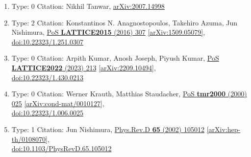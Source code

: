 \documentclass[a4paper,10pt]{article}
\begin{document}
\begin{enumerate}
\begin{enumerate}
  \item Type: 0 Citation: Nikhil Tanwar, \href{https://arxiv.org/abs/2007.14998}{arXiv:2007.14998}
  \item Type: 2 Citation: Konstantinos N. Anagnostopoulos, Takehiro Azuma, Jun Nishimura, \href{https://www.doi.org/10.22323/1.251.0307}{PoS {\bf LATTICE2015} (2016) 307}  \href{https://arxiv.org/abs/1509.05079}{[arXiv:1509.05079]},\\\href{https://www.doi.org/10.22323/1.251.0307}{doi:10.22323/1.251.0307}
  \item Type: 0 Citation: Arpith Kumar, Anosh Joseph, Piyush Kumar, \href{https://www.doi.org/10.22323/1.430.0213}{PoS {\bf LATTICE2022} (2023) 213}  \href{https://arxiv.org/abs/2209.10494}{[arXiv:2209.10494]},\\\href{https://www.doi.org/10.22323/1.430.0213}{doi:10.22323/1.430.0213}
  \item Type: 0 Citation: Werner Krauth, Matthias Staudacher, \href{https://www.doi.org/10.22323/1.006.0025}{PoS {\bf tmr2000} (2000) 025}  \href{https://arxiv.org/abs/cond-mat/0010127}{[arXiv:cond-mat/0010127]},\\\href{https://www.doi.org/10.22323/1.006.0025}{doi:10.22323/1.006.0025}
  \item Type: 1 Citation: Jun Nishimura, \href{https://www.doi.org/10.1103/PhysRevD.65.105012}{Phys.Rev.D {\bf 65} (2002) 105012}  \href{https://arxiv.org/abs/hep-th/0108070}{[arXiv:hep-th/0108070]},\\\href{https://www.doi.org/10.1103/PhysRevD.65.105012}{doi:10.1103/PhysRevD.65.105012}

\end{enumerate}
\end{enumerate}
\end{document}
